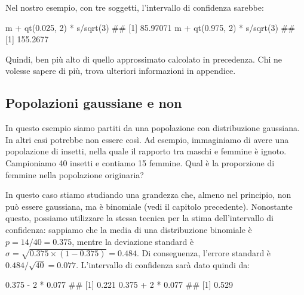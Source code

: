 \documentclass[a4paper,12pt,oneside]{book}
\newenvironment{Shaded}{}{}
\newcommand{\KeywordTok}[1]{#1}
\newcommand{\DecValTok}[1]{#1}
\newcommand{\FloatTok}[1]{#1}
\newcommand{\StringTok}[1]{#1}
\newcommand{\CommentTok}[1]{#1}
\newcommand{\OperatorTok}[1]{#1}
\newcommand{\NormalTok}[1]{#1}
\begin{document}
Nel nostro esempio, con tre soggetti, l'intervallo di confidenza sarebbe:

\begin{Shaded}
\begin{Highlighting}[]
\NormalTok{m }\OperatorTok{+}\StringTok{ }\KeywordTok{qt}\NormalTok{(}\FloatTok{0.025}\NormalTok{, }\DecValTok{2}\NormalTok{) }\OperatorTok{*}\StringTok{ }\NormalTok{s}\OperatorTok{/}\KeywordTok{sqrt}\NormalTok{(}\DecValTok{3}\NormalTok{)}
\CommentTok{## [1] 85.97071}
\NormalTok{m }\OperatorTok{+}\StringTok{ }\KeywordTok{qt}\NormalTok{(}\FloatTok{0.975}\NormalTok{, }\DecValTok{2}\NormalTok{) }\OperatorTok{*}\StringTok{ }\NormalTok{s}\OperatorTok{/}\KeywordTok{sqrt}\NormalTok{(}\DecValTok{3}\NormalTok{)}
\CommentTok{## [1] 155.2677}
\end{Highlighting}
\end{Shaded}

Quindi, ben più alto di quello approssimato calcolato in precedenza. Chi ne volesse sapere di più, trova ulteriori informazioni in appendice.

\hypertarget{popolazioni-gaussiane-e-non}{%
\subsection{Popolazioni gaussiane e non}\label{popolazioni-gaussiane-e-non}}

In questo esempio siamo partiti da una popolazione con distribuzione gaussiana. In altri casi potrebbe non essere così. Ad esempio, immaginiamo di avere una popolazione di insetti, nella quale il rapporto tra maschi e femmine è ignoto. Campioniamo 40 insetti e contiamo 15 femmine. Qual è la proporzione di femmine nella popolazione originaria?

In questo caso stiamo studiando una grandezza che, almeno nel principio, non può essere gaussiana, ma è binomiale (vedi il capitolo precedente). Nonostante questo, possiamo utilizzare la stessa tecnica per la stima dell'intervallo di confidenza: sappiamo che la media di una distribuzione binomiale è \(p = 14/40 = 0.375\), mentre la deviazione standard è \(\sigma = \sqrt{0.375 \times (1 - 0.375)} = 0.484\). Di conseguenza, l'errore standard è \(0.484 / \sqrt{40} = 0.077\). L'intervallo di confidenza sarà dato quindi da:

\begin{Shaded}
\begin{Highlighting}[]
\FloatTok{0.375} \OperatorTok{-}\StringTok{ }\DecValTok{2} \OperatorTok{*}\StringTok{ }\FloatTok{0.077}
\CommentTok{## [1] 0.221}
\FloatTok{0.375} \OperatorTok{+}\StringTok{ }\DecValTok{2} \OperatorTok{*}\StringTok{ }\FloatTok{0.077}
\CommentTok{## [1] 0.529}
\end{Highlighting}
\end{Shaded}
\end{document}
